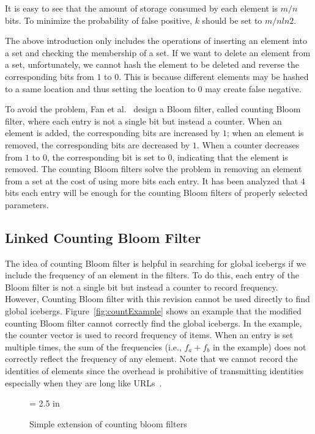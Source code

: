\documentclass[11pt,twocolumn]{IEEEtran} %
\begin{document}
It is easy to see that the amount of storage consumed by each element is $m/n$ bits. To minimize the probability of false positive, $k$ should be set to $m/nln2$.

The above introduction only includes the operations of inserting an element into a set and checking the membership of a set. If we want to delete an element from a set, unfortunately, we cannot hash the element to be deleted and reverse the corresponding bits from $1$ to $0$. This is because different elements may be hashed to a same location and thus setting the location to $0$ may create false negative. 

To avoid the problem, Fan et al.~\cite{Fan} design a Bloom filter, called counting Bloom filter, where each entry is not a single bit but instead a counter. When an element is added, the corresponding bits are increased by $1$; when an element is removed, the corresponding bits are decreased by $1$. When a counter decreases from $1$ to $0$, the corresponding bit is set to $0$, indicating that the element is removed. The counting Bloom filters solve the problem in removing an element from a set at the cost of using more bits each entry. It has been analyzed that $4$ bits each entry will be enough for the counting Bloom filters of properly selected parameters.  
 
\subsection{Linked Counting Bloom Filter}

The idea of counting Bloom filter is helpful in searching for global icebergs if we include the frequency of an element in the filters. To do this, each entry of the Bloom filter is not a single bit but instead a counter to record frequency. However, Counting Bloom filter with this revision cannot be used directly to find global icebergs. Figure~\ref{fig:countExample} shows an example that the modified counting Bloom filter cannot correctly find the global icebergs. In the example, the counter vector is used to record frequency of items. When an entry is set multiple times, the sum of the frequencies (i.e., $f_a+f_b$ in the example) does not correctly reflect the frequency of any element. Note that we cannot record the identities of elements since the overhead is prohibitive of transmitting identities especially when they are long like URLs~\cite{Fan}.  


\begin{figure}[tp]
\centerline {\epsfxsize = 2.5 in }
\caption{Simple extension of counting bloom filters }
\label{fig:example}
\end{figure}
\end{document}
